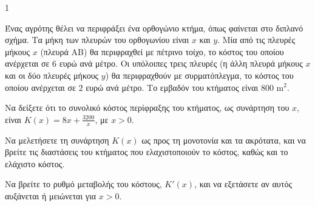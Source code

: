 \begin{ylh}{1}
    \item [Διαφορικός Λογισμός - Εφαρμογές παραγώγων]
\end{ylh}
\begin{figure}
    \centering
\end{figure}
Ένας αγρότης θέλει να περιφράξει ένα ορθογώνιο κτήμα, όπως φαίνεται στο διπλανό σχήμα. Τα μήκη των πλευρών του ορθογωνίου είναι $x$ και $y$.
Μία από τις πλευρές μήκους $x$ (πλευρά AB) θα περιφραχθεί με πέτρινο τοίχο, το κόστος του οποίου ανέρχεται σε $6$ ευρώ ανά μέτρο.
Οι υπόλοιπες τρεις πλευρές (η άλλη πλευρά μήκους $x$ και οι δύο πλευρές μήκους $y$) θα περιφραχθούν με συρματόπλεγμα, το κόστος του οποίου ανέρχεται σε $2$ ευρώ ανά μέτρο.
Το εμβαδόν του κτήματος είναι $800 \text{ m}^2$.

\begin{alist}
\item Να δείξετε ότι το συνολικό κόστος περίφραξης του κτήματος, ως συνάρτηση του $x$, είναι $K(x) = 8x + \frac{3200}{x}$, με $x > 0$. 
\item Να μελετήσετε τη συνάρτηση $K(x)$ ως προς τη μονοτονία και τα ακρότατα, και να βρείτε τις διαστάσεις του κτήματος που ελαχιστοποιούν το κόστος, καθώς και το ελάχιστο κόστος. 
\item Να βρείτε το ρυθμό μεταβολής του κόστους, $K'(x)$, και να εξετάσετε αν αυτός αυξάνεται ή μειώνεται για $x>0$. 
\end{alist}